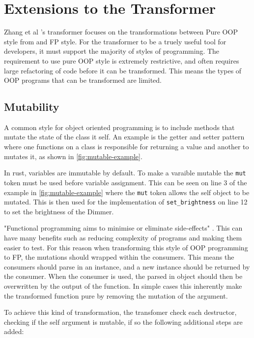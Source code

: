 \documentclass[ oneside,%
                    author={James Elgar},
                    degree={MEng},
                     title={Bidirectional transformer between functional and \\ object-oriented programming in Rust},
                  subtitle={}]{dissertation}
\newcommand{\weixin}{Zhang et al }
\newcommand{\rust}[1]{\texttt{#1}}
\begin{document}
\chapter{Extensions to the Transformer}

\weixin's transformer focuses on the transformations between Pure OOP style from \cite{cook} and FP style. For the transformer to be a truely useful tool for developers, it must support the majority of styles of programming. 
The requirement to use pure OOP style is extremely restrictive, and often requires large refactoring of code before it can be transformed.
This means the types of OOP programs that can be transformed are limited.

\section{Mutability}

A common style for object oriented programming is to include methods that mutate the state of the class it self. An example is the getter and setter pattern where one functions on a class is responsible for returning a value and another to mutates it, as shown in \autoref{fig:mutable-example}.

In rust, variables are immutable by default. To make a varaible mutable the \rust{mut} token must be used before variable assignment. This can be seen on line 3 of the example in \autoref{fig:mutable-example} where the \verb|mut| token allows the self object to be mutated. This is then used for the implementation of \rust{set_brightness} on line 12 to set the brightness of the Dimmer. 

"Functional programming aims to minimise or eliminate side-effects" \cite{fp-uok}. This can have many benefits such as reducing complexity of programs and making them easier to test. For this reason when transforming this style of OOP programming to FP, the mutations should wrapped within the consumers. This means the consumers should parse in an instance, and a new instance should be returned by the consumer. When the consumer is used, the parsed in object should then be overwritten by the output of the function.  In simple cases this inherently make the transformed function pure by removing the mutation of the argument.

To achieve this kind of transformation, the transfomer check each destructor, checking if the self argument is mutable, if so the following additional steps are added:
\end{document}
